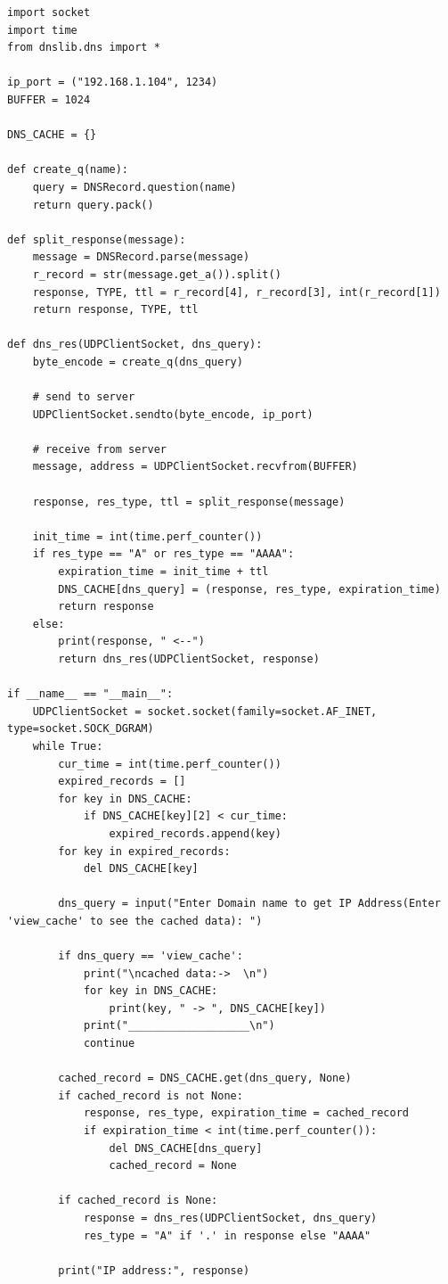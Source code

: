 \documentclass[11pt]{article}
\begin{document}
\begin{verbatim}
import socket
import time
from dnslib.dns import *

ip_port = ("192.168.1.104", 1234)
BUFFER = 1024

DNS_CACHE = {}

def create_q(name):
    query = DNSRecord.question(name)
    return query.pack()

def split_response(message):
    message = DNSRecord.parse(message)
    r_record = str(message.get_a()).split()
    response, TYPE, ttl = r_record[4], r_record[3], int(r_record[1])
    return response, TYPE, ttl

def dns_res(UDPClientSocket, dns_query):
    byte_encode = create_q(dns_query)

    # send to server
    UDPClientSocket.sendto(byte_encode, ip_port)

    # receive from server
    message, address = UDPClientSocket.recvfrom(BUFFER)

    response, res_type, ttl = split_response(message)

    init_time = int(time.perf_counter())
    if res_type == "A" or res_type == "AAAA":
        expiration_time = init_time + ttl
        DNS_CACHE[dns_query] = (response, res_type, expiration_time)
        return response
    else:
        print(response, " <--")
        return dns_res(UDPClientSocket, response)

if __name__ == "__main__":
    UDPClientSocket = socket.socket(family=socket.AF_INET, type=socket.SOCK_DGRAM)
    while True:
        cur_time = int(time.perf_counter())
        expired_records = []
        for key in DNS_CACHE:
            if DNS_CACHE[key][2] < cur_time:
                expired_records.append(key)
        for key in expired_records:
            del DNS_CACHE[key]

        dns_query = input("Enter Domain name to get IP Address(Enter 'view_cache' to see the cached data): ")

        if dns_query == 'view_cache':
            print("\ncached data:->  \n")
            for key in DNS_CACHE:
                print(key, " -> ", DNS_CACHE[key])
            print("___________________\n")
            continue

        cached_record = DNS_CACHE.get(dns_query, None)
        if cached_record is not None:
            response, res_type, expiration_time = cached_record
            if expiration_time < int(time.perf_counter()):
                del DNS_CACHE[dns_query]
                cached_record = None

        if cached_record is None:
            response = dns_res(UDPClientSocket, dns_query)
            res_type = "A" if '.' in response else "AAAA"

        print("IP address:", response)
\end{verbatim}
\end{document}
